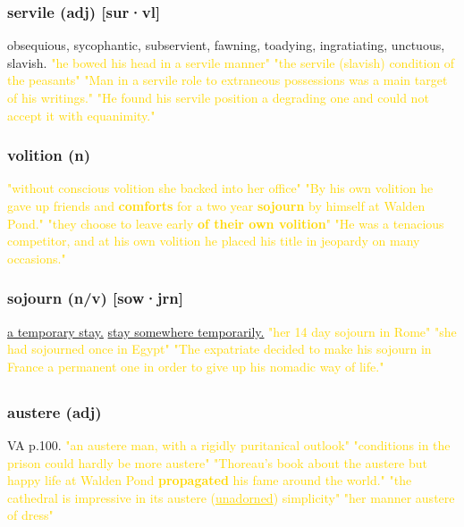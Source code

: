 \documentclass{proc}
\begin{document}
	\subsubsection{\textcolor{brickred}{servile} (adj) [sur·vl]}
	obsequious,
	sycophantic,
	subservient,
	fawning,
	toadying,
	ingratiating,
	unctuous, slavish.
	\textcolor{gold}{"he bowed his head in a servile manner" "the servile (slavish) condition of the peasants" "Man in a servile role to 
		extraneous possessions was a main target of his writings." "He found his servile position a degrading one and could not accept it
		with equanimity."}
	
	\subsubsection{\textcolor{brickred}{volition} (n)}
	\textcolor{gold}{"without conscious volition she backed into her office" "By his own volition he gave up friends and 
		\textbf{comforts} for a two year \textbf{sojourn} by himself at Walden Pond." "they choose to leave early \textbf{of their own volition}" "He was a tenacious competitor, and at his own volition he placed his title 
		in jeopardy on many occasions."}
	
	\subsubsection{\textcolor{brickred}{sojourn} (n/v) [sow·jrn]}
	\underline{a temporary stay.} \underline{stay somewhere temporarily.}
	\textcolor{gold}{"her 14 day sojourn in Rome" "she had sojourned once in Egypt" "The expatriate decided to make his sojourn in France a permanent one in 
		order to give up his nomadic way of life."}
	
	\newpage
	\subsection{}
	\subsubsection{\textcolor{brickred}{austere} (adj)}
	VA p.100.
	\textcolor{gold}{"an austere man, with a rigidly puritanical outlook" "conditions in the prison could hardly be more austere" "Thoreau's book about the austere but happy life at Walden Pond \textbf{propagated} his fame around the world." "the cathedral is impressive in its austere (\underline{unadorned}) simplicity" "her manner austere of dress"}
	
\end{document}
